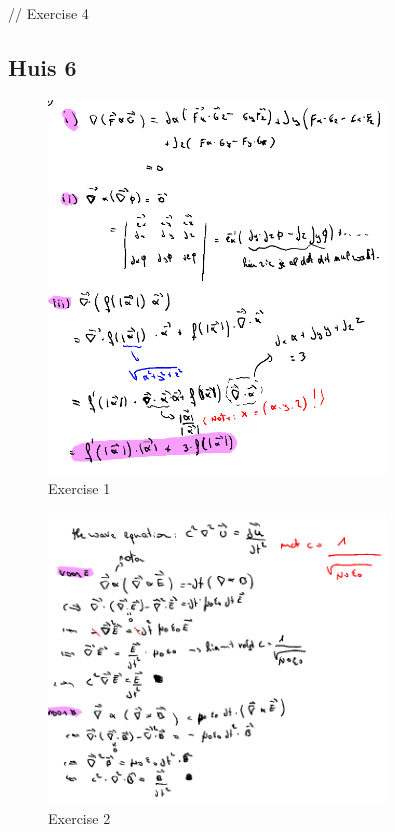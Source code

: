 \documentclass[a4paper]{report}
\begin{document}
// Exercise 4


\subsection*{Huis 6}


\begin{figure}[H]
	\centering
	\includegraphics[width=0.8\textwidth]{assets/huis_6_ex_1.png}
	\caption{Exercise 1}
	\label{fig:huis_6_ex_1}
\end{figure}


\begin{figure}[H]
	\centering
	\includegraphics[width=0.8\textwidth]{assets/huis_6_ex_2.png}
	\caption{Exercise 2}
	\label{fig:huis_6_ex_2}
\end{figure}
\end{document}
